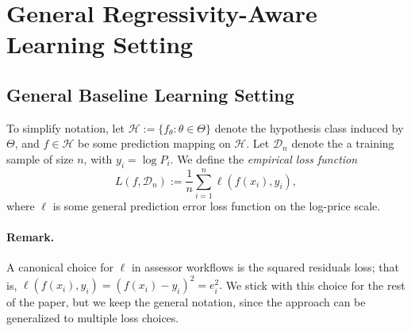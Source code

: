 \documentclass[12pt, draft]{article}
\theoremstyle{plain}
\theoremstyle{definition}
\newcommand{\1}{\mathbf{1}}
\newcommand{\D}{\mathcal{D}}
\renewcommand{\H}{\mathcal{H}}
\begin{document}
\section{General Regressivity-Aware Learning Setting}







\subsection{General Baseline Learning Setting}

To simplify notation, let
$
\H := \{f_\theta : \theta \in \Theta\}
$
denote the hypothesis class induced by $\Theta$, and $f \in \H$ be some prediction mapping on $\H$. Let $\D_n$ denote the a training sample of size $n$, with $y_i = \log P_i$. We define the \textit{empirical loss function} 
\[
L(f, \D_n)
:=
\frac{1}{n}\sum_{i=1}^n \ell(f(x_i),y_i),
\]
where $\ell$ is some general prediction error loss function on the log-price scale. 

\paragraph{Remark.} A canonical choice for $\ell$ in assessor workflows is the squared residuals loss; that is, 
$
\ell(f(x_i),y_i)=(f(x_i)-y_i)^2=e_i^2.
$
We stick with this choice for the rest of the paper, but we keep the general notation, since the approach can be generalized to multiple loss choices.
\end{document}
